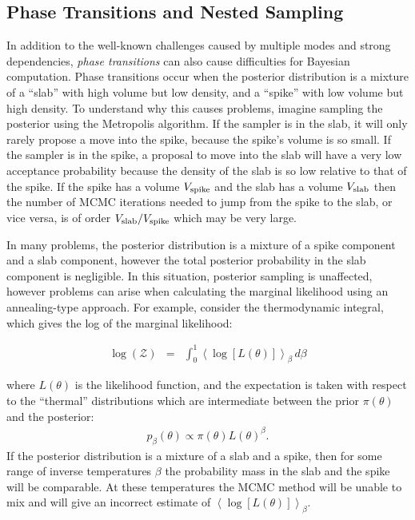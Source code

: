 \documentclass[letterpaper, 11pt]{article}
\begin{document}
\subsection{Phase Transitions and Nested Sampling}
In addition to the well-known challenges caused by multiple modes and strong
dependencies,
{\it phase transitions} \citep{skilling} can also cause difficulties for
Bayesian computation. Phase transitions occur when the posterior distribution
is a mixture of a ``slab'' with high volume but low density, and a ``spike''
with low volume but high density. To understand why this causes problems,
imagine sampling the posterior using the Metropolis algorithm. If the sampler
is in the slab, it will only rarely propose a move into the spike, because the
spike's volume is so small. If the sampler is in the spike, a proposal to move
into the slab will have a very low acceptance probability because the density
of the slab is so low relative to that of the spike. If the spike has a volume
$V_{\rm spike}$ and the slab has a volume $V_{\rm slab}$ then the number of
MCMC iterations needed to jump from the spike to the slab, or vice versa, is
of order $V_{\rm slab}/V_{\rm spike}$ which may be very large.

In many problems, the posterior distribution is a mixture of a spike component
and a slab component, however the total posterior probability in the slab
component is negligible. In this situation, posterior sampling is unaffected,
however problems can arise when calculating the marginal likelihood using
an annealing-type approach. For example, consider the thermodynamic integral,
which gives the log of the marginal likelihood:

\begin{eqnarray}
\log(\mathcal{Z}) &=& \int_0^1
\left<\log\left[L(\theta)\right]\right>_\beta \,d\beta
\end{eqnarray}

where $L(\theta)$ is the likelihood function, and the expectation is taken
with respect to the ``thermal'' distributions which are intermediate
between the prior $\pi(\theta)$ and the posterior:
\begin{eqnarray}
p_\beta(\theta) \propto \pi(\theta)L(\theta)^\beta.\label{eq:annealing}
\end{eqnarray}
If the posterior distribution is a mixture of a slab and a spike,
then for some range of inverse temperatures $\beta$ the probability mass in
the slab and the spike will be comparable. At these temperatures the MCMC
method will be unable to mix and will give an incorrect estimate of
$\left<\log\left[L(\theta)\right]\right>_\beta$.
\end{document}
